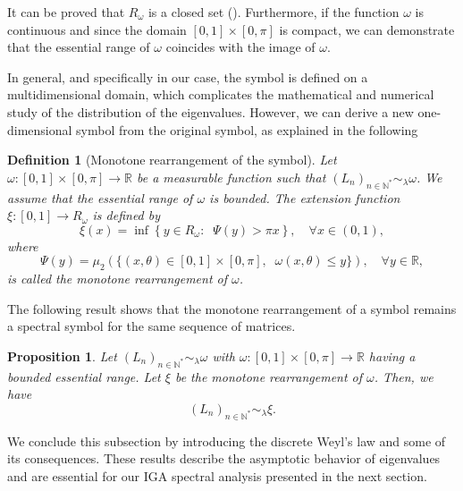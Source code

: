 \documentclass[11pt]{article}
\newtheorem{definition}{Definition}[section]
\newtheorem{proposition}{Proposition}[section]
\begin{document}
It can be proved that $ R_{\omega}$ is a closed set (\cite[Lemma 2.1]{garoni2017generalized}). Furthermore, if the function $\omega$ is continuous  and  since the domain $[0,1]\times[0,\pi]$ is compact, we can demonstrate that the essential range of $\omega$ coincides with the image of $\omega$.  

In general, and specifically in our case, the symbol is defined on a multidimensional domain, which complicates the mathematical and numerical study of the distribution of the eigenvalues. However, we can  derive  a new one-dimensional symbol from the original symbol, as explained  in  the following  
\begin{definition}[Monotone rearrangement of the symbol]\label{def:monotone-rearrangement}  
Let $\omega: [0,1] \times [0,\pi] \longrightarrow \mathbb{R}$ be a measurable function such that $(L_n)_{n\in\mathbb{N}^*} \sim_{\lambda} \omega$. We assume that the essential range of $\omega$ is bounded. The extension function $\xi: [0,1] \longrightarrow R_{\omega}$  is  defined by  
$$  
\xi(x)=\inf\left\{ y\in  R_{\omega}:\;\; \Psi(y)>\pi  x  \right\},  
\quad \forall x\in(0,1),$$  
where   
\begin{equation}\label{eq:function-psi}  
\Psi(y)=\mu_{2}(\{  (x,\theta)\in [0,1]\times[0,\pi],\;\; \omega(x,\theta)\leq y    \}),\quad \forall y\in \mathbb{R},  
\end{equation}  
is called the monotone rearrangement of $\omega$.  
\end{definition}  

The following result \cite{bianchi2021analysis} shows that the monotone rearrangement of a symbol remains a spectral symbol for the same sequence of matrices.  

\begin{proposition}  
Let $(L_n)_{n\in\mathbb{N}^*} \sim_{\lambda} \omega$ with $\omega: [0,1] \times [0,\pi] \longrightarrow \mathbb{R}$  having a bounded essential range. Let $\xi$ be the monotone rearrangement of $\omega$. Then, we have  
$$   
(L_{n})_{n\in\mathbb{N}^{*}}\sim_{\lambda}\xi.  
$$  
\end{proposition}  

We conclude this subsection by introducing the discrete Weyl's law and some of its consequences. These results   describe the asymptotic behavior of eigenvalues  and are essential for our IGA spectral analysis  presented in the next section.  
\end{document}
